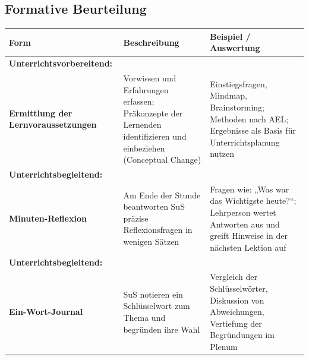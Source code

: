 \subsection{Formative Beurteilung}
\begin{table}[H]
  \footnotesize
  \begin{tabular}{>{\bfseries}p{3.5cm} | p{4.5cm} | p{7cm}}
    \toprule
    \textbf{Form}                                                                                                    & \textbf{Beschreibung} & \textbf{Beispiel / Auswertung} \\
    \midrule
    Unterrichtsvorbereitend:                                                                                                                                                  \\
    Ermittlung der Lernvoraussetzungen                                                                               &
    Vorwissen und Erfahrungen erfassen; Präkonzepte der Lernenden identifizieren und einbeziehen (Conceptual Change) &
    Einstiegsfragen, Mindmap, Brainstorming; Methoden nach AEL; Ergebnisse als Basis für Unterrichtsplanung nutzen                                                            \\
    \midrule
    Unterrichtsbegleitend:                                                                                                                                                    \\
    Minuten-Reflexion                                                                                                &
    Am Ende der Stunde beantworten SuS präzise Reflexionsfragen in wenigen Sätzen                                    &
    Fragen wie: „Was war das Wichtigste heute?“; Lehrperson wertet Antworten aus und greift Hinweise in der nächsten Lektion auf                                              \\
    \midrule
    Unterrichtsbegleitend:                                                                                                                                                    \\
    Ein-Wort-Journal                                                                                                 &
    SuS notieren ein Schlüsselwort zum Thema und begründen ihre Wahl                                                 &
    Vergleich der Schlüsselwörter, Diskussion von Abweichungen, Vertiefung der Begründungen im Plenum                                                                         \\

\end{tabular}
\end{table}
